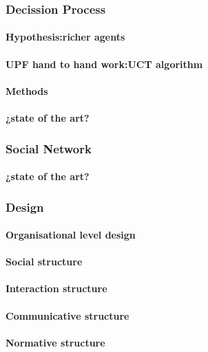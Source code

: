 \documentclass{report}
\begin{document}
			\subsubsection{Decission Process}
				\paragraph{Hypothesis:richer agents}
				\paragraph{UPF hand to hand work:UCT algorithm}
				\paragraph{Methods}
				\paragraph{¿state of the art?}
				
			\subsubsection{Social Network}
				\paragraph{¿state of the art?}

			\subsubsection{Design}
				\paragraph{Organisational level design}
				\paragraph{Social structure}
				\paragraph{Interaction structure}
				\paragraph{Communicative structure}
				\paragraph{Normative structure}
				
\end{document}
